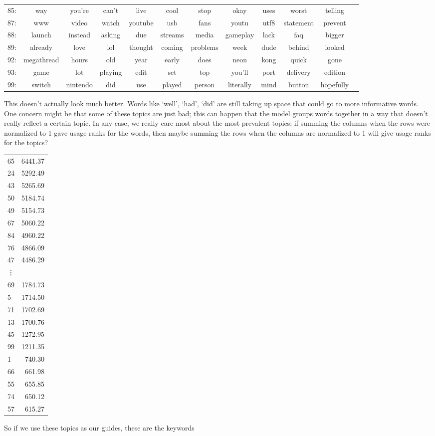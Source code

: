 \documentclass[11pt]{article} %
\begin{document}
\begin{landscape}
\begin{tabular}{|l|c c c c c c c c c c c}
85: &  way&you're&can't&live&cool&stop&okay&uses&worst&telling\\
87: &  www&video&watch&youtube&usb&fans&youtu&utf8&statement&prevent\\
88: &  launch&instead&asking&due&streams&media&gameplay&lack&faq&bigger\\
89: &  already&love&lol&thought&coming&problems&week&dude&behind&looked\\
92: &  megathread&hours&old&year&early&does&neon&kong&quick&gone\\
93: &  game&lot&playing&edit&set&top&you'll&port&delivery&edition\\
99: &  switch&nintendo&did&use&played&person&literally&mind&button&hopefully\\
\end{tabular}

\end{landscape}
\restoregeometry

This doesn't actually look much better. Words like `well', `had', `did' are still taking up space that could go to more informative words. One concern might be that some of these topics are just bad; this can happen that the model groups words together in a way that doesn't really reflect a certain topic. In any case, we really care most about the most prevalent topics; if summing the columns when the rows were normalized to 1 gave usage ranks for the words, then maybe summing the rows when the columns are normalized to 1 will give usage ranks for the topics?

\begin{tabular}{|l|r|}
65 & 6441.37 \\
24 & 5292.49 \\
43 & 5265.69 \\
50 & 5184.74 \\
49 & 5154.73 \\
67 & 5060.22 \\
84 & 4960.22 \\
76 & 4866.09 \\
47 & 4486.29 \\
\vdots & \\
69 & 1784.73 \\
5 & 1714.50 \\
71 & 1702.69 \\
13 & 1700.76 \\
45 & 1272.95 \\
99 & 1211.35 \\
1 & 740.30 \\
66 & 661.98 \\
55 & 655.85 \\
74 & 650.12 \\
57 & 615.27 \\
\end{tabular}
 So if we use these topics as our guides, these are the keywords
\end{document}
